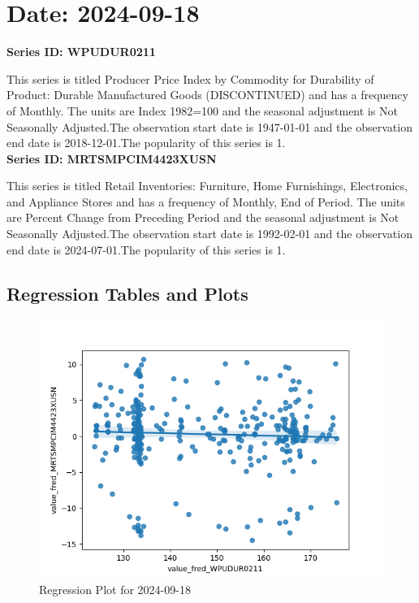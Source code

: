 \section{Date: 2024-09-18}
\noindent \textbf{Series ID: WPUDUR0211} 

\noindent This series is titled Producer Price Index by Commodity for Durability of Product: Durable Manufactured Goods (DISCONTINUED) and has a frequency of Monthly. The units are Index 1982=100 and the seasonal adjustment is Not Seasonally Adjusted.The observation start date is 1947-01-01 and the observation end date is 2018-12-01.The popularity of this series is 1. \\ 

\noindent \textbf{Series ID: MRTSMPCIM4423XUSN} 

\noindent This series is titled Retail Inventories: Furniture, Home Furnishings, Electronics, and Appliance Stores and has a frequency of Monthly, End of Period. The units are Percent Change from Preceding Period and the seasonal adjustment is Not Seasonally Adjusted.The observation start date is 1992-02-01 and the observation end date is 2024-07-01.The popularity of this series is 1. \\ 

\subsection{Regression Tables and Plots}


\begin{figure}
\centering
\includegraphics[scale = 0.9]{plots/plot_2024-09-18.png}
\caption{Regression Plot for 2024-09-18}
\end{figure}
\newpage
